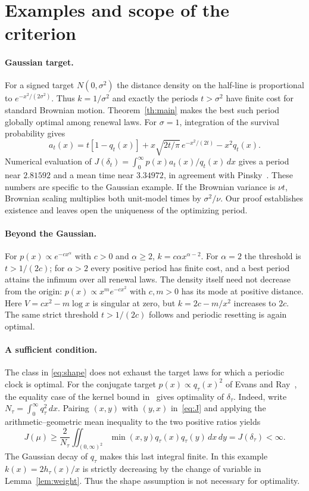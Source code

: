 \documentclass[11pt]{article}
\begin{document}
\section{Examples and scope of the criterion}
\paragraph{Gaussian target.}
For a signed target $N(0,\sigma^2)$ the distance density on the half-line
is proportional to $e^{-x^2/(2\sigma^2)}$. Thus $k=1/\sigma^2$ and exactly
the periods $t>\sigma^2$ have finite cost for standard Brownian motion.
Theorem~\ref{th:main} makes the best such period globally optimal among
renewal laws. For $\sigma=1$, integration of the survival probability gives
\[
 a_t(x)=t[1-q_t(x)]+x\sqrt{2t/\pi}\,e^{-x^2/(2t)}-x^2q_t(x).
\]
Numerical evaluation of $J(\delta_t)=\int_0^\infty p(x)a_t(x)/q_t(x)\,dx$
gives a period near $2.81592$ and a mean time near $3.34972$, in agreement
with Pinsky~\cite[Eq.~(1.13)]{pinsky}. These numbers are specific to the
Gaussian example. If the Brownian variance is $\nu t$, Brownian scaling
multiplies both unit-model times by $\sigma^2/\nu$. Our proof establishes
existence and leaves open the uniqueness of the optimizing period.

\paragraph{Beyond the Gaussian.}
For $p(x)\propto e^{-c x^\alpha}$ with $c>0$ and $\alpha\ge2$,
$k=c\alpha x^{\alpha-2}$. For $\alpha=2$ the threshold is $t>1/(2c)$;
for $\alpha>2$ every positive period has finite cost, and a best period
attains the infimum over all renewal laws. The density itself need not
decrease from the origin: $p(x)\propto x^m e^{-cx^2}$ with $c,m>0$
has its mode at positive distance. Here $V=cx^2-m\log x$ is singular at
zero, but $k=2c-m/x^2$ increases to $2c$. The same strict threshold
$t>1/(2c)$ follows and periodic resetting is again optimal.

\paragraph{A sufficient condition.}
The class in \eqref{eq:shape} does not exhaust the target laws for which a
periodic clock is optimal. For the conjugate target
$p(x)\propto q_\tau(x)^2$ of Evans and Ray~\cite{evans}, the equality case
of the kernel bound in~\cite{note} gives optimality of $\delta_\tau$.
Indeed, write $N_\tau=\int_0^\infty q_\tau^2\,dx$. Pairing $(x,y)$ with
$(y,x)$ in~\eqref{eq:J} and applying the arithmetic--geometric mean
inequality to the two positive ratios yields
\[
 J(\mu)\ge \frac{2}{N_\tau}\iint_{(0,\infty)^2}
 \min(x,y)q_\tau(x)q_\tau(y)\,dx\,dy=J(\delta_\tau)<\infty .
\]
The Gaussian decay of $q_\tau$ makes this last integral finite.
In this example $k(x)=2h_\tau(x)/x$ is strictly decreasing by the change
of variable in Lemma~\ref{lem:weight}. Thus the shape assumption is not
necessary for optimality.
\end{document}
